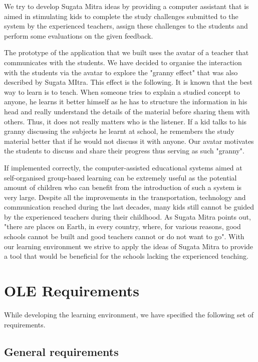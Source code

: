 \documentclass[a4paper]{article}
\begin{document}

We try to develop Sugata Mitra ideas by providing a computer assistant that is aimed in stimulating kids to complete the study challenges submitted to the system by the experienced teachers, assign these challenges to the students and perform some evaluations on the given feedback.

The prototype of the application that we built uses the avatar of a teacher that communicates with the students. We have decided to organise the interaction with the students via the avatar to explore the "granny effect" that was also described by Sugata MItra. This effect is the following. It is known that the best way to learn is to teach. When someone tries to explain a studied concept to anyone, he learns it better himself as he has to structure the information in his head and really understand the details of the material before sharing them with others. Thus, it does not really matters who is the listener. If a kid talks to his granny discussing the subjects he learnt at school, he remembers the study material better that if he would not discuss it with anyone. Our avatar motivates the students to discuss and share their progress thus serving as such "granny".

If implemented correctly, the computer-assisted educational systems aimed at self-organised group-based learning can be extremely useful as the potential amount of children who can benefit from the introduction of such a system is very large. Despite all the improvements in the transportation, technology and communication reached during the last decades, many kids still cannot be guided by the experienced teachers during their childhood. As Sugata Mitra points out, "there are places on Earth, in every country, where, for various reasons, good schools cannot be built and good teachers cannot or do not want to go". With our learning environment we strive to apply the ideas of Sugata Mitra to provide a tool that would be beneficial for the schools lacking the experienced teaching.


\section{OLE Requirements}

While developing the learning environment, we have specified the following set of requirements.

\subsection{General requirements}
\end{document}
